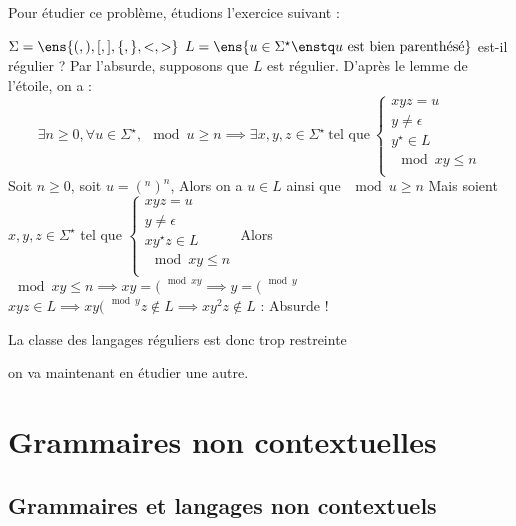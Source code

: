    Pour étudier ce problème, étudions l'exercice suivant :
    \begin{exercise}{}{}
        $\Sigma = \ens{(, ), [, ], \{, \}, <, >}$
        $L = \ens{u \in \Sigma^\star \enstq u \ \text{est bien parenthésé}}$ est-il régulier ?
        \tcblower
        Par l'absurde, supposons que $L$ est  régulier. D'après le lemme de l'étoile, on a :
        \[\exists n \geq 0, \forall u \in \Sigma^\star, \mod{u} \geq n \implies \exists x, y, z \in \Sigma^\star \ \text{tel que} \ \left\lbrace\begin{array}{l}
            xyz = u\\
            y \neq \epsilon\\
            y^\star \in L\\
            \mod{xy} \leq n\\
        \end{array}\right.\]
        Soit $n \geq 0$, soit $u = (^n )^n$,
        Alors on a $u \in L$ ainsi que $\mod{u} \geq n$
        Mais soient $x, y, z \in \Sigma^\star$ tel que
        $\left\lbrace\begin{array}{l}
            xyz = u\\
            y \neq \epsilon\\
            xy^\star z \in L\\
            \mod{xy} \leq n\\
        \end{array}\right.$
        Alors $\mod{xy} \leq n \implies xy = (^{\mod{xy}} \implies y = (^{\mod{y}}$
        $xyz \in L \implies xy(^{\mod{y}}z \not\in L \implies xy^2z \notin L$ : Absurde !
        
    \end{exercise}
    
    La classe des langages réguliers est donc trop restreinte
    
    on va maintenant en étudier une autre.
    
    \section{Grammaires non contextuelles}
        
    \subsection{Grammaires et langages non contextuels}
    
